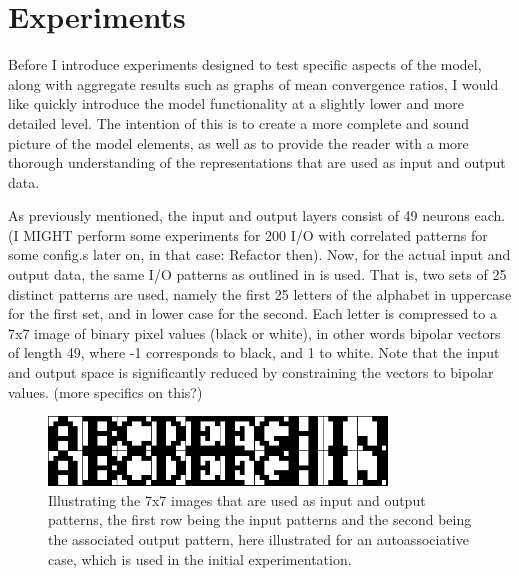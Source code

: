 \section{Experiments}\label{section:experiments}

Before I introduce experiments designed to test specific aspects of the model, along with aggregate results such as graphs of mean convergence ratios, I would like quickly introduce the model functionality at a slightly lower and more detailed level. The intention of this is to create a more complete and sound picture of the model elements, as well as to provide the reader with a more thorough understanding of the representations that are used as input and output data. 

As previously mentioned, the input and output layers consist of 49 neurons each. (I MIGHT perform some experiments for 200 I/O with correlated patterns for some config.s later on, in that case: Refactor then). Now, for the actual input and output data, the same I/O patterns as outlined in \citep{Hattori2010, Hattori2014} is used. That is, two sets of 25 distinct patterns are used, namely the first 25 letters of the alphabet in uppercase for the first set, and in lower case for the second. Each letter is compressed to a 7x7 image of binary pixel values (black or white), in other words bipolar vectors of length 49, where -1 corresponds to black, and 1 to white. Note that the input and output space is significantly reduced by constraining the vectors to bipolar values. (more specifics on this?)

\begin{figure}\label{fig:sample_letters}
    \centering
    \includegraphics[width=9cm]{fig/im_both.png}
    \caption{Illustrating the 7x7 images that are used as input and output patterns, the first row being the input patterns and the second being the associated output pattern, here illustrated for an autoassociative case, which is used in the initial experimentation.}
\end{figure}

